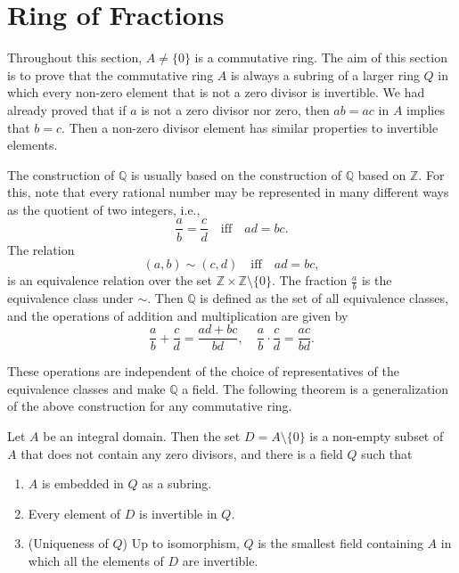 \documentclass[11pt,a4paper]{article}
\begin{document}
\def\contador{Lesson 12}


\section{Ring of Fractions}



Throughout this section, $A \neq \{0\}$ is a commutative ring. The aim of this section is to prove that the commutative ring $A$ is always a subring of a larger ring $Q$ in which every non-zero element that is not a zero divisor is invertible. We had already proved that if $a$ is not a zero divisor nor zero, then $ab = ac$ in $A$ implies that $b = c$. Then a non-zero divisor element has similar properties to invertible elements.

The construction of $\mathbb{Q}$ is usually based on the construction of $\mathbb{Q}$ based on $\mathbb{Z}$. For this, note that every rational number may be represented in many different ways as the quotient of two integers, i.e.,
\[
\frac{a}{b} = \frac{c}{d} \quad \text{iff} \quad ad = bc.
\]
The relation
\[
(a, b) \sim (c, d) \quad \text{iff} \quad ad = bc,
\]
is an equivalence relation over the set $\mathbb{Z} \times \mathbb{Z} \setminus \{0\}$. The fraction $\frac{a}{b}$ is the equivalence class under $\sim$. Then $\mathbb{Q}$ is defined as the set of all equivalence classes, and the operations of addition and multiplication are given by
\[
\frac{a}{b} + \frac{c}{d} = \frac{ad + bc}{bd}, \quad \frac{a}{b} \cdot \frac{c}{d} = \frac{ac}{bd}.
\]

These operations are independent of the choice of representatives of the equivalence classes and make $\mathbb{Q}$ a field. The following theorem is a generalization of the above construction for any commutative ring.

\begin{teo} 
Let $A$ be an integral domain. Then the set $D = A \setminus \{0\}$ is a non-empty subset of $A$ that does not contain any zero divisors, and there is a field $Q$ such that
\begin{enumerate}[label=(\roman*)]
    \item $A$ is embedded in $Q$ as a subring.
    \item Every element of $D$ is invertible in $Q$.
    \item (Uniqueness of $Q$) Up to isomorphism, $Q$ is the smallest field containing $A$ in which all the elements of $D$ are invertible.
\end{enumerate}
\end{teo}
\end{document}

